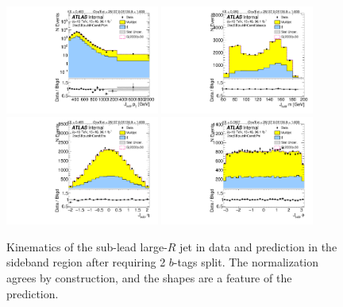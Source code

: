 \begin{figure}[htbp!]
\begin{center}
\includegraphics[width=0.45\textwidth,angle=-90]{figures/boosted/Sideband/b77_TwoTag_split_Sideband_sublHCand_Pt_m_1.pdf}
\includegraphics[width=0.45\textwidth,angle=-90]{figures/boosted/Sideband/b77_TwoTag_split_Sideband_sublHCand_Mass_s.pdf}\\
\includegraphics[width=0.45\textwidth,angle=-90]{figures/boosted/Sideband/b77_TwoTag_split_Sideband_sublHCand_Eta.pdf}
\includegraphics[width=0.45\textwidth,angle=-90]{figures/boosted/Sideband/b77_TwoTag_split_Sideband_sublHCand_Phi.pdf}
  \caption{Kinematics of the sub-lead large-$R$ jet in data and prediction in the sideband region after requiring 2 $b$-tags split. The normalization agrees by construction, and the shapes are a feature of the prediction.}
  \label{fig:boosted-2bs-sideband-ak10-subl}
\end{center}
\end{figure}

